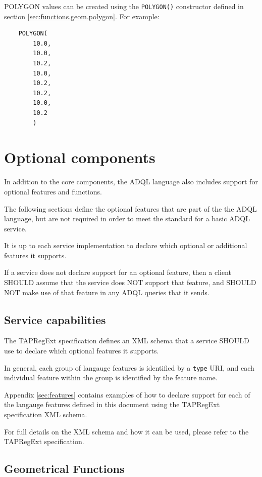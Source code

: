 \documentclass[11pt,a4paper]{ivoa}
\newcommand{\TAPRegExtSpec}{TAPRegExt specification\xspace}
\begin{document}
POLYGON values can be created using the \verb:POLYGON():
constructor defined in section \ref{sec:functions.geom.polygon}.
For example:
\begin{verbatim}
    POLYGON(
        10.0,
        10.0,
        10.2,
        10.0,
        10.2,
        10.2,
        10.0,
        10.2
        )
\end{verbatim}

\clearpage
\section{Optional components}
\label{sec:optional}

In addition to the core components, the ADQL language also includes support
for optional features and functions.

The following sections define the optional features that are part of the
the ADQL language, but are not required in order to meet the standard for
a basic ADQL service.

It is up to each service implementation to declare which optional or
additional features it supports.

If a service does not declare support for an optional feature,
then a client SHOULD assume that the service does NOT support
that feature, and SHOULD NOT make use of that feature in any
ADQL queries that it sends.

\subsection{Service capabilities}
\label{sec:capabilities}

The \TAPRegExtSpec defines an XML schema that a service SHOULD
use to declare which optional features it supports.

In general, each group of langauge features is identified by a \verb:type:
URI, and each individual feature within the group is identified by the
feature name.

Appendix \ref{sec:features} contains examples of how to declare support
for each of the langauge features defined in this document using the
\TAPRegExtSpec XML schema.

For full details on the XML schema and how it can be used, please refer to
the \TAPRegExtSpec.

\subsection{Geometrical Functions}
\label{sec:functions.geom}
\end{document}
